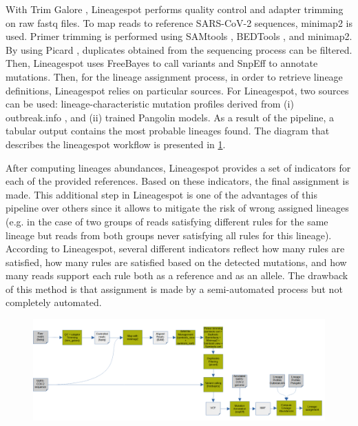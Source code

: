         With Trim Galore \cite{krueger2021}, Lineagespot performs quality control and adapter trimming on raw \acrshort{fastq} files. To map reads to reference SARS-CoV-2 sequences, minimap2 \cite{li2018} is used. Primer trimming is performed using SAMtools \cite{li2009}, BEDTools \cite{bedtools}, and minimap2. By using Picard \cite{picard}, duplicates obtained from the sequencing process can be filtered. Then, Lineagespot uses FreeBayes \cite{garrison2012} to call variants and SnpEff \cite{snpeff} to annotate mutations. Then, for the lineage assignment process, in order to retrieve lineage definitions, Lineagespot relies on particular sources. For Lineagespot, two sources can be used: lineage-characteristic mutation profiles derived from (i) outbreak.info \cite{outbreakinfo}, and (ii) trained Pangolin \cite{otoole2021} models. As a result of the pipeline, a tabular output contains the most probable lineages found. The diagram that describes the lineagespot workflow is presented in \cref{fig:prior:ls}.
        
        After computing lineages abundances, Lineagespot provides a set of indicators for each of the provided references. Based on these indicators, the final assignment is made. This additional step in Lineagespot is one of the advantages of this pipeline over others since it allows to mitigate the risk of wrong assigned lineages (e.g. in the case of two groups of reads satisfying different rules for the same lineage but reads from both groups never satisfying all rules for this lineage). According to Lineagespot, several different indicators reflect how many rules are satisfied, how many rules are satisfied based on the detected mutations, and how many reads support each rule both as a reference and as an allele. The drawback of this method is that assignment is made by a semi-automated process but not completely automated.
        \begin{landscape}
        \centering\vspace*{\fill}
        \begin{center}
        \begin{figure}[H]
        	\centering
            \includegraphics[width=1.4\textwidth]{figures/prior/lineagespot.png}
            \label{fig:prior:ls}
        \end{figure}
        \end{center}
        \vfill
        \end{landscape}
        
